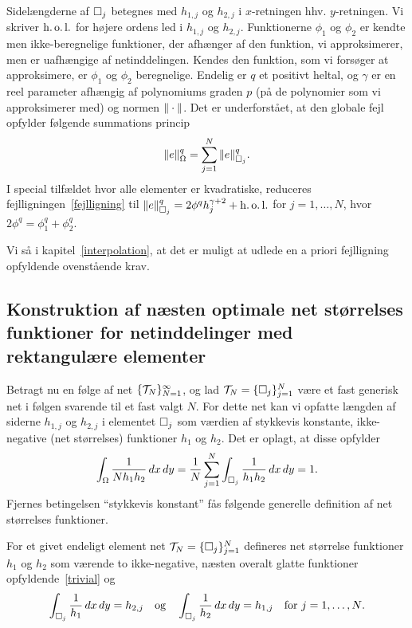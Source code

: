 Sidelængderne af $\Box_j$
betegnes med $h_{1,j}$ og $h_{2,j}$ i $x$-retningen hhv.
$y$-retningen. Vi skriver $\operatorname{h.o.l.}$ for højere ordens led i $h_{1,j}$ og
$h_{2,j}$. Funktionerne $\phi_1$ og $\phi_2$ er kendte men
ikke-beregnelige funktioner, der afhænger af den funktion, vi
approksimerer, men er uafhængige af netinddelingen. Kendes den
funktion, som vi forsøger at approksimere, er $\phi_1$ og $\phi_2$
beregnelige. Endelig er $q$ et positivt heltal, og $\gamma$ er en reel
parameter afhængig af polynomiums graden $p$ (på de polynomier som vi
approksimerer med) og normen $\|\cdot\|$.
Det er underforstået, at den globale fejl opfylder følgende
summations princip
\begin{equation} \label{sumprincip}
  \|e\|^q_{\Omega} = \sum_{j=1}^N \|e\|^q_{\Box_j}.
\end{equation}
I special tilfældet hvor alle elementer er kvadratiske, reduceres
fejlligningen~\eqref{fejlligning} til $\|e\|^q_{\Box_j} = 2\phi^q
h_j^{\gamma +2} + \operatorname{h.o.l.} $ for $j=1,\ldots,N$, hvor
$2\phi^q=\phi_1^q+\phi_2^q$.

Vi så i kapitel~\ref{interpolation}, at det er muligt at udlede en a priori
fejlligning opfyldende oven\-stå\-en\-de krav. 

\subsection{Konstruktion af næsten optimale net størrelses funktioner
for netinddelinger med rektangulære elementer}
Betragt nu en følge af net $\{\mathcal T_N\}_{N=1}^\infty$, og lad
$\mathcal T_N=\{\Box_j\}_{j=1}^N$ være et fast generisk net i følgen svarende
til et fast valgt $N$. For dette net kan vi opfatte længden af siderne
$h_{1,j}$ og $h_{2,j}$ i elementet $\Box_j$ som værdien af 
stykkevis konstante, ikke-negative (net størrelses) funktioner $h_1$ og
$h_2$. Det er oplagt, at disse opfylder
\begin{equation} \label{trivial}
  \int_{\Omega} \frac{1}{Nh_1 h_2}\, dx\, dy = 
  \frac{1}{N} \sum_{j=1}^N \int_{\Box_j} \frac{1}{h_1 h_2}\, dx\, dy = 1.  
\end{equation}
Fjernes betingelsen ``stykkevis konstant'' fås følgende generelle
definition af net stør\-rel\-ses funktioner.
\begin{definition}
For et givet endeligt element net $\mathcal T_N=\{\Box_j\}_{j=1}^N$ defineres
net størrelse funktioner $h_1$ og $h_2$ som værende to
ikke-negative, næsten overalt glatte funktioner
opfyldende~\eqref{trivial} og 
\begin{equation} \label{def-mfc}
  \int_{\Box_j} \frac{1}{h_1}\, dx\, dy = h_{2,j}
  \quad \text{og} \quad
  \int_{\Box_j} \frac{1}{h_2}\, dx\, dy = h_{1,j}
  \quad \text{for $j=1,\ldots,N$.}
\end{equation}
\end{definition}


